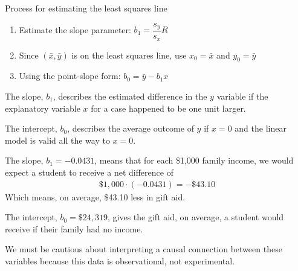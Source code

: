 \documentclass{beamer}
\begin{document}
\begin{frame}
  \begin{block}{Process for estimating the least squares line}
    \begin{enumerate}
    \item Estimate the slope parameter: $b_1=\dfrac{s_y}{s_x} R$
    \item Since $(\bar{x}, \bar{y})$ is on the least squares line, use $x_0=\bar{x}$ and $y_0=\bar{y}$
    \item Using the point-slope form: $b_0=\bar{y}-b_1 x$
    \end{enumerate}
  \end{block}\pause

  \begin{note}
    The slope, $b_1$, describes the estimated difference in the $y$ variable if the explanatory variable $x$ for a case happened to be one unit larger.
  \end{note}\pause

  \begin{note}
    The intercept, $b_0$, describes the average outcome of $y$ if $x=0$ and the linear model is valid all the way to $x=0$.
  \end{note}
\end{frame}

\begin{frame}
  \begin{examplecont}
    The slope, $b_1=-0.0431$, means that for each \$1,000 family income, we would expect a student to receive a net difference of
    \begin{equation*}
      \begin{aligned}
        \$1,000 \cdot (-0.0431) = -\$43.10
      \end{aligned}
    \end{equation*}\pause
    Which means, on average, \$43.10 less in gift aid.\pause

    \vspace{2mm}
    The intercept, $b_0=\$24,319$, gives the gift aid, on average, a student would receive if their family had no income.
  \end{examplecont}\pause

  \begin{note}
    We must be cautious about interpreting a causal connection between these variables because this data is observational, not experimental.
  \end{note}
\end{frame}
\end{document}
